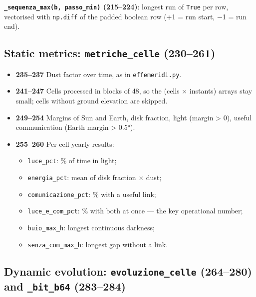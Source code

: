 \documentclass[11pt,a4paper]{article}
\providecommand{\tightlist}{\setlength{\itemsep}{0pt}\setlength{\parskip}{0pt}}
\begin{document}
\textbf{\texttt{\_sequenza\_max(b, passo\_min)}
(215--224)}: longest run of \texttt{True} per row,
vectorised with \texttt{np.diff} of the padded boolean
row (+1 = run start, −1 = run end).

\hypertarget{static-metrics-metriche_celle-230261}{%
\subsection{\texorpdfstring{Static metrics: \texttt{metriche\_celle}
(230--261)}{Static metrics: metriche\_celle (230--261)}}\label{static-metrics-metriche_celle-230261}}

\begin{itemize}
\tightlist
\item
  \textbf{235--237} Dust factor over time, as in
  \texttt{effemeridi.py}.
\item
  \textbf{241--247} Cells processed in blocks of 48, so the (cells ×
  instants) arrays stay small; cells without ground elevation are
  skipped.
\item
  \textbf{249--254} Margins of Sun and Earth, disk fraction, light
  (margin \textgreater{} 0), useful communication (Earth margin
  \textgreater{} 0.5°).
\item
  \textbf{255--260} Per-cell yearly results:

  \begin{itemize}
  \tightlist
  \item
    \texttt{luce\_pct}: \% of time in light;
  \item
    \texttt{energia\_pct}: mean of disk fraction ×
    dust;
  \item
    \texttt{comunicazione\_pct}: \% with a useful link;
  \item
    \texttt{luce\_e\_com\_pct}: \% with both at once
    --- the key operational number;
  \item
    \texttt{buio\_max\_h}: longest continuous darkness;
  \item
    \texttt{senza\_com\_max\_h}: longest gap without a
    link.
  \end{itemize}
\end{itemize}

\hypertarget{dynamic-evolution-evoluzione_celle-264280-and-_bit_b64-283284}{%
\subsection{\texorpdfstring{Dynamic evolution:
\texttt{evoluzione\_celle} (264--280) and \texttt{\_bit\_b64}
(283--284)}{Dynamic evolution: evoluzione\_celle (264--280) and \_bit\_b64 (283--284)}}\label{dynamic-evolution-evoluzione_celle-264280-and-_bit_b64-283284}}
\end{document}
